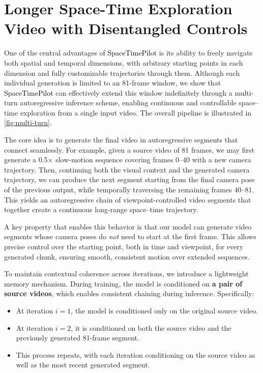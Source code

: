 \documentclass[10pt,twocolumn,letterpaper]{article}
\newcommand{\nameCOLOR}[1]{\textcolor{black}{#1}}
\newcommand{\nameMethod}{\nameCOLOR{\mbox{SpaceTimePilot}}\xspace}
\begin{document}
\section{Longer Space-Time Exploration Video with Disentangled Controls}

 One of the central advantages of \nameMethod is its ability to freely navigate both spatial and temporal dimensions, with arbitrary starting points in each dimension and fully customizable trajectories through them. Although each individual generation is limited to an 81-frame window, we show that \nameMethod can effectively extend this window indefinitely through a multi-turn autoregressive inference scheme, enabling continuous and controllable space–time exploration from a single input video. The overall pipeline is illustrated in \cref{fig:multi-turn}.

The core idea is to generate the final video in autoregressive segments that connect seamlessly.  For example, given a source video of 81 frames, we may first generate a 0.5$\times$ slow-motion sequence covering frames 0–40 with a new camera trajectory. Then, continuing both the visual context and the generated camera trajectory, we can produce the next segment starting from the final camera pose of the previous output, while temporally traversing the remaining frames 40–81. This yields an autoregressive chain of viewpoint-controlled video segments that together create a continuous long-range space–time trajectory.

A key property that enables this behavior is that our model can generate video segments whose camera poses do \emph{not} need to start at the first frame. 
This allows precise control over the starting point, both in time and viewpoint, for every generated chunk, ensuring smooth, consistent motion over extended sequences.

To maintain contextual coherence across iterations, we introduce a lightweight memory mechanism. During training, the model is conditioned on \textbf{a pair of source videos}, which enables consistent chaining during inference. Specifically:
\begin{itemize}
\item At iteration $i = 1$, the model is conditioned only on the original source video.
\item At iteration $i = 2$, it is conditioned on both the source video and the previously generated 81-frame segment.
\item This process repeats, with each iteration conditioning on the source video as well as the most recent generated segment.
\end{itemize}
\end{document}
